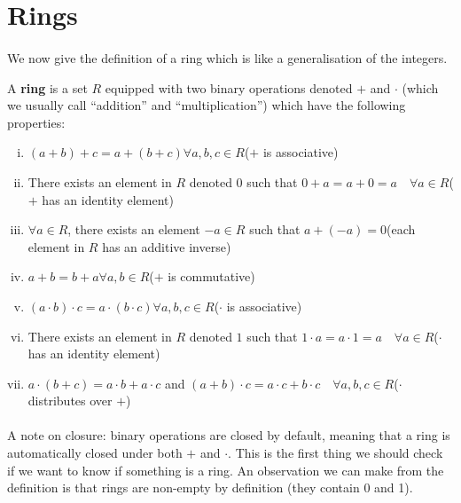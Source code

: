 \documentclass[../abstract_algebra.tex]{subfiles}
\begin{document}
    \section{Rings}
        \paragraph{}
        We now give the definition of a ring which is like a generalisation of the integers.
        \begin{definition}
            A \textbf{ring} is a set $R$ equipped with two binary operations denoted $+$ and $\cdot$ (which we usually call ``addition'' and ``multiplication'') which have the following properties:
            \begin{enumerate}[(i)]
                \item $(a+b)+c=a+(b+c)$\quad$\forall a,b,c\in R$\quad($+$ is associative)
                \item There exists an element in $R$ denoted $0$ such that $0+a=a+0=a\quad\forall a\in R$\quad($+$ has an identity element)
                \item $\forall a\in R$, there exists an element $-a\in R$ such that $a+(-a)=0$\quad(each element in $R$ has an additive inverse)
                \item $a+b=b+a$\quad$\forall a,b\in R$\quad($+$ is commutative)
                \item $(a\cdot b)\cdot c=a\cdot(b\cdot c)$\quad$\forall a,b,c\in R$\quad($\cdot$ is associative)
                \item There exists an element in $R$ denoted $1$ such that $1\cdot a=a\cdot 1=a\quad\forall a\in R$\quad($\cdot$ has an identity element)
                \item $a\cdot(b+c)=a\cdot b+a\cdot c$ and $(a+b)\cdot c=a\cdot c +b\cdot c\quad\forall a,b,c\in R$\quad($\cdot$ distributes over $+$)
            \end{enumerate}
        \end{definition}

        \paragraph{}
        A note on closure: binary operations are closed by default, meaning that a ring is automatically closed under both $+$ and $\cdot$.
        This is the first thing we should check if we want to know if something is a ring.
        An observation we can make from the definition is that rings are non-empty by definition (they contain 0 and 1).
\end{document}
